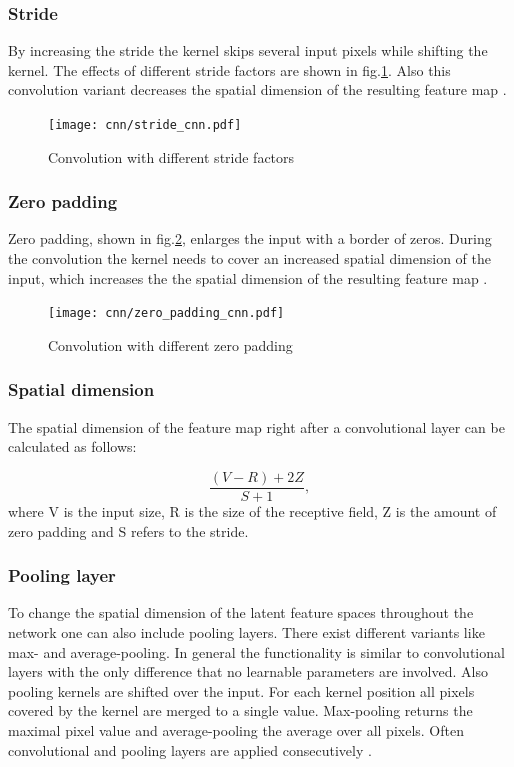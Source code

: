 \subsubsection{Stride}
By increasing the stride the kernel skips several input pixels while shifting the kernel. The effects of different stride factors are shown in fig.\ref{fig:stride_cnn}. Also this convolution variant decreases the spatial dimension of the resulting feature map \cite{OShea2015}.

\begin{figure}[htpb]
  \centering
  \texttt{[image: cnn/stride\_cnn.pdf]}
  \caption {Convolution with different stride factors}
  \label{fig:stride_cnn}
\end{figure}
\FloatBarrier 

\subsubsection{Zero padding}
Zero padding, shown in fig.\ref{fig:zero_padding_cnn}, enlarges the input with a border of zeros. During the convolution the kernel needs to cover an increased spatial dimension of the input, which increases the the spatial dimension of the resulting feature map \cite{OShea2015}.

\begin{figure}[htpb]
  \centering
  \texttt{[image: cnn/zero\_padding\_cnn.pdf]}
  \caption {Convolution with different zero padding}
  \label{fig:zero_padding_cnn}
\end{figure}
\FloatBarrier 


\subsubsection{Spatial dimension}

 The spatial dimension of the feature map right after a convolutional layer can be calculated as follows:

\begin{equation}
  \frac{(V-R)+2Z}{S+1}, 
  \label{eq:spatial_dimensionality_cnn_feature map}
\end{equation}
where V is the input size, R is the size of the receptive field, Z is the amount of zero padding and S refers to the stride.

\subsubsection{Pooling layer}
To change the spatial dimension of the latent feature spaces throughout the network one can also include pooling layers. There exist different variants like max- and average-pooling. In general the functionality is similar to convolutional layers with the only difference that no learnable parameters are involved. Also pooling kernels are shifted over the input. For each kernel position all pixels covered by the kernel are merged to a single value. Max-pooling returns the maximal pixel value and average-pooling the average over all pixels. Often convolutional and pooling layers are applied consecutively \cite{OShea2015}.

